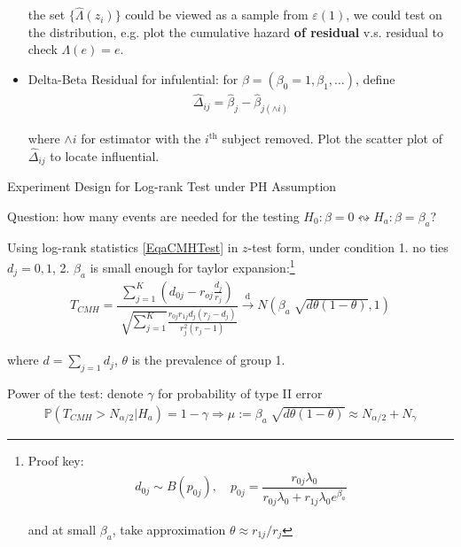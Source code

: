 \begin{itemize}[topsep=2pt,itemsep=0pt]
    the set $ \{\hat{\Lambda }(z_i)\} $ could be viewed as a sample from $ \varepsilon (1) $, we could test on the distribution, e.g. plot the cumulative hazard \textbf{of residual} v.s. residual to check $ \Lambda (e)=e $.
    
    \item Delta-Beta Residual for infulential:  for $ \beta =(\beta _0=1,\beta _1,\ldots) $, define
    \begin{align}
        \hat{\Delta }_{ij}=\hat{\beta }_j-\hat{\beta }_{j(\wedge i)} 
    \end{align}

    where $ \wedge i $ for estimator with the $ i^\mathrm{th}  $ subject removed. Plot the scatter plot of $ \hat{\Delta }_{ij} $ to locate influential.

\end{itemize}

\begin{point}
    Experiment Design for Log-rank Test under PH Assumption
\end{point}

    Question: how many events are needed for the testing $ H_0:\beta =0\leftrightsquigarrow H_a:\beta =\beta _a $?

    Using log-rank statistics \autoref{EqaCMHTest} in $ z $-test form, under condition 1. no ties $ d_j=0,1 $, 2. $ \beta _a $ is small enough for taylor expansion:\footnote{Proof key: 
    \begin{align}
        d_{0j}\sim B(p_{0j}), \quad  p_{0j}=\dfrac{r_{0j}\lambda _0}{r_{0j}\lambda _0+r_{1j}\lambda _0e^{\beta _a} }
    \end{align}
    
    and at small $ \beta _a $, take approximation $ \theta \approx r_{1j}/r_{j} $
    }
    \begin{align}
        T_{CMH}= \dfrac{\sum_{j=1}^K\left( d_{0j}-r_{oj}\frac{d_j}{r_j} \right)}{\sqrt[]{\sum_{j=1}^K}\frac{r_{0j}r_{1j}d_j(r_j-d_j)}{r_j^2(r_j-1)}}\xrightarrow[]{\mathrm{d}} N(\beta _a\sqrt[]{d\theta (1-\theta )}, 1)
    \end{align}

    where $ d=\sum_{j=1}d_j $, $ \theta  $ is the prevalence of group 1.

    Power of the test: denote $ \gamma  $ for probability of type II error
    \begin{align}
        \mathbb{P}\left( T_{CMH}>N_{\alpha /2}|H_a \right) = 1-\gamma \Rightarrow \mu :=\beta _a\sqrt[]{d\theta (1-\theta )}\approx N_{\alpha /2}+N_\gamma 
    \end{align}

